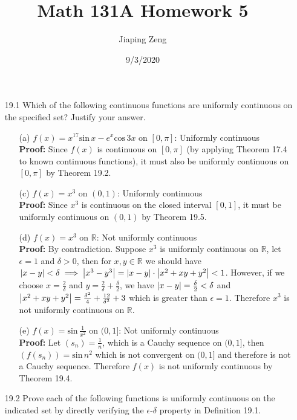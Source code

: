 \documentclass{article}
\title{Math 131A Homework 5}
\date{9/3/2020}
\author{Jiaping Zeng}
\begin{document}
\maketitle

\begin{itemize}
    \item [19.1] Which of the following continuous functions are uniformly continuous on the specified set? Justify your answer.
          \begin{itemize}
              \item [(a)] $f(x)=x^{17}\text{sin}\,x-e^x\text{cos}\,3x$ on $[0,\pi]$: Uniformly continuous\\\textbf{Proof: }Since $f(x)$ is continuous on $[0,\pi]$ (by applying Theorem 17.4 to known continuous functions), it must also be uniformly continuous on $[0,\pi]$ by Theorem 19.2.
              \item [(c)] $f(x)=x^3$ on $(0,1)$: Uniformly continuous\\\textbf{Proof: }Since $x^3$ is continuous on the closed interval $[0,1]$, it must be uniformly continuous on $(0,1)$ by Theorem 19.5.
              \item [(d)] $f(x)=x^3$ on $\mathbb{R}$: Not uniformly continuous\\\textbf{Proof: } By contradiction. Suppose $x^3$ is uniformly continuous on $\mathbb{R}$, let $\epsilon=1$ and $\delta>0$, then for $x,y\in\mathbb{R}$ we should have $\abs{x-y}<\delta\implies\abs{x^3-y^3}=\abs{x-y}\cdot\abs{x^2+xy+y^2}<1$. However, if we choose $x=\frac{2}{\delta}$ and $y=\frac{2}{\delta}+\frac{\delta}{2}$, we have $\abs{x-y}=\frac{\delta}{2}<\delta$ and $\abs{x^2+xy+y^2}=\frac{\delta^2}{4}+\frac{12}{\delta^2}+3$ which is greater than $\epsilon=1$. Therefore $x^3$ is not uniformly continuous on $\mathbb{R}$.
              \item [(e)] $f(x)=\text{sin}\,\frac{1}{x^2}$ on $(0,1]$: Not uniformly continuous\\\textbf{Proof: }Let $(s_n)=\frac{1}{n}$, which is a Cauchy sequence on $(0,1]$, then $(f(s_n))=\text{sin}\,n^2$ which is not convergent on $(0,1]$ and therefore is not a Cauchy sequence. Therefore $f(x)$ is not uniformly continuous by Theorem 19.4.
          \end{itemize}
    \item [19.2] Prove each of the following functions is uniformly continuous on the indicated set by directly verifying the $\epsilon$-$\delta$ property in Definition 19.1.
          \begin{itemize}

\end{itemize}
\end{itemize}
\end{document}
